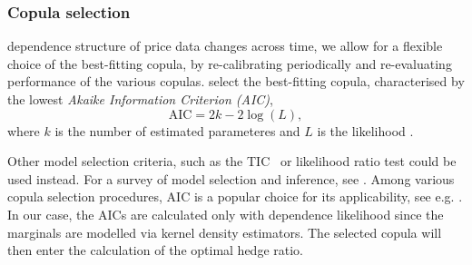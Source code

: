 
\subsubsection{Copula selection}\label{subsec:copula-selection}
 dependence structure of price data changes
across time,  we allow for a flexible choice of the best-fitting
copula, by re-calibrating periodically and re-evaluating performance
of the various copulas. 
 select the best-fitting
copula, characterised by the lowest {\em Akaike Information Criterion
  (AIC)},
\begin{equation*}
 \text{AIC} = 2k- 2 \log(L),
\end{equation*}
where $k$ is the number of estimated
parameteres and $L$ is the likelihood \citep{Akaike1973}. 

Other model selection criteria, such as the TIC~\citep{takeuchi1976distribution} or likelihood ratio test could be used instead.
For a survey of model selection and inference, see \cite{anderson1998comparison}.
Among various copula selection procedures, AIC is a popular choice for
its applicability, see e.g. \cite{breymann2003dependence}.
In our case, the AICs are calculated only with dependence likelihood
since the marginals are modelled via kernel density estimators.
The selected copula will then enter the calculation of the optimal
hedge ratio.



